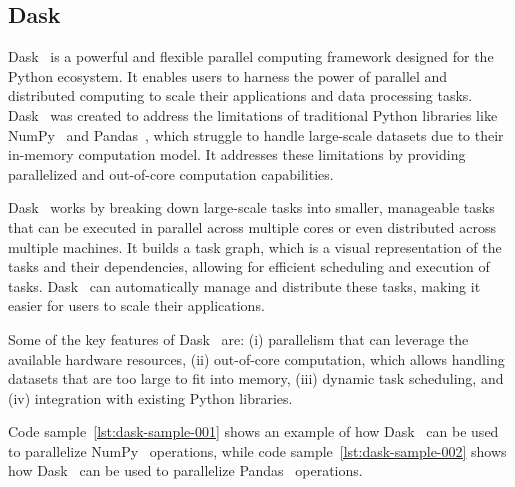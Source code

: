 \subsection{Dask}
\label{subsec:dask}

Dask~\cite{dask} is a powerful and flexible parallel computing framework designed for the Python ecosystem.
It enables users to harness the power of parallel and distributed computing to scale their applications and data processing tasks.
Dask~\cite{dask} was created to address the limitations of traditional Python libraries like NumPy~\cite{numpy} and Pandas~\cite{pandas}, which struggle to handle large-scale datasets due to their in-memory computation model.
It addresses these limitations by providing parallelized and out-of-core computation capabilities.

Dask~\cite{dask} works by breaking down large-scale tasks into smaller, manageable tasks that can be executed in parallel across multiple cores or even distributed across multiple machines.
It builds a task graph, which is a visual representation of the tasks and their dependencies, allowing for efficient scheduling and execution of tasks.
Dask~\cite{dask} can automatically manage and distribute these tasks, making it easier for users to scale their applications.

Some of the key features of Dask~\cite{dask} are:
(i) parallelism that can leverage the available hardware resources,
(ii) out-of-core computation, which allows handling datasets that are too large to fit into memory,
(iii) dynamic task scheduling, and
(iv) integration with existing Python libraries.

Code sample~\ref{lst:dask-sample-001} shows an example of how Dask~\cite{dask} can be used to parallelize NumPy~\cite{numpy} operations, while code sample~\ref{lst:dask-sample-002} shows how Dask~\cite{dask} can be used to parallelize Pandas~\cite{pandas} operations.



